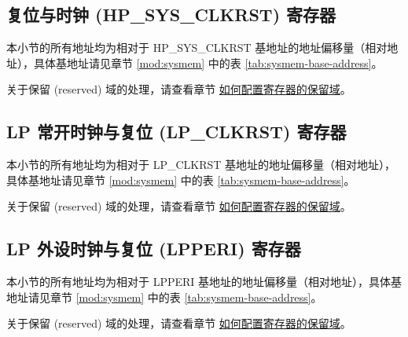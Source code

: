 \documentclass[main\_\_CN.tex]{subfiles}
\begin{document}
\subsection{复位与时钟 (HP\_SYS\_CLKRST) 寄存器}

本小节的所有地址均为相对于 HP\_SYS\_CLKRST 基地址的地址偏移量（相对地址），具体基地址请见章节 \ref{mod:sysmem} \textit{} 中的表 \ref{tab:sysmem-base-address}。

关于保留 (reserved) 域的处理，请查看章节 \hyperref[programming-reserved-field]{如何配置寄存器的保留域}。



\subsection{LP 常开时钟与复位 (LP\_CLKRST) 寄存器}

本小节的所有地址均为相对于 LP\_CLKRST 基地址的地址偏移量（相对地址），具体基地址请见章节 \ref{mod:sysmem} \textit{} 中的表 \ref{tab:sysmem-base-address}。

关于保留 (reserved) 域的处理，请查看章节 \hyperref[programming-reserved-field]{如何配置寄存器的保留域}。



\subsection{LP 外设时钟与复位 (LPPERI) 寄存器}

本小节的所有地址均为相对于 LPPERI 基地址的地址偏移量（相对地址），具体基地址请见章节 \ref{mod:sysmem} \textit{} 中的表 \ref{tab:sysmem-base-address}。

关于保留 (reserved) 域的处理，请查看章节 \hyperref[programming-reserved-field]{如何配置寄存器的保留域}。


\end{document}
